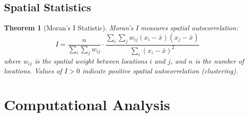 \documentclass[a4paper, 11pt]{article}
\newtheorem{theorem}{Theorem}[section]
\begin{document}
\subsection{Spatial Statistics}

\begin{theorem}[Moran's I Statistic]
Moran's I measures spatial autocorrelation:
\begin{equation}
I = \frac{n}{\sum_i \sum_j w_{ij}} \cdot \frac{\sum_i \sum_j w_{ij}(x_i - \bar{x})(x_j - \bar{x})}{\sum_i (x_i - \bar{x})^2}
\end{equation}
where $w_{ij}$ is the spatial weight between locations $i$ and $j$, and $n$ is the number of locations.
Values of $I > 0$ indicate positive spatial autocorrelation (clustering).
\end{theorem}

\section{Computational Analysis}
\end{document}
